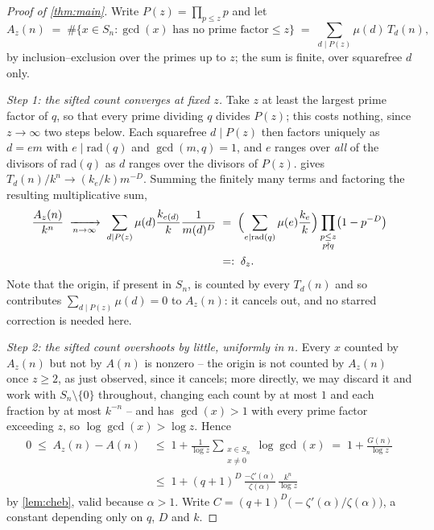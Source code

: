 \documentclass[11pt]{amsart}
\theoremstyle{definition}
\theoremstyle{remark}
\begin{document}
\begin{proof}[Proof of \cref{thm:main}]
Write $P(z) = \prod_{p \le z} p$ and let
\[
  A_z(n) \;=\; \#\{x \in S_n : \gcd(x) \text{ has no prime factor} \le z\}
  \;=\; \sum_{d \mid P(z)} \mu(d)\,T_d(n),
\]
by inclusion--exclusion over the primes up to $z$; the sum is finite, over squarefree $d$ only.

\emph{Step 1: the sifted count converges at fixed $z$.} Take $z$ at least the largest prime factor of $q$, so that every prime dividing $q$ divides $P(z)$; this costs nothing, since $z \to \infty$ two steps below. Each squarefree $d \mid P(z)$ then factors uniquely as $d = e m$ with $e \mid \mathrm{rad}(q)$ and $\gcd(m,q)=1$, and $e$ ranges over \emph{all} of the divisors of $\mathrm{rad}(q)$ as $d$ ranges over the divisors of $P(z)$.  gives $T_d(n)/k^n \to (k_e/k)m^{-D}$. Summing the finitely many terms and factoring the resulting multiplicative sum,
\begin{align*}
  \frac{A_z(n)}{k^{n}} \;\xrightarrow[n\to\infty]{}\;
  \sum_{d \mid P(z)}\mu(d)\frac{k_{e(d)}}{k}\frac{1}{m(d)^{D}}
  &\;=\; \Bigl(\sum_{e \mid \mathrm{rad}(q)}\mu(e)\frac{k_e}{k}\Bigr)
  \prod_{\substack{p \le z \\ p \nmid q}}\bigl(1-p^{-D}\bigr) \\
  &\;=:\; \delta_z .
\end{align*}
Note that the origin, if present in $S_n$, is counted by every $T_d(n)$ and so contributes $\sum_{d\mid P(z)}\mu(d) = 0$ to $A_z(n)$: it cancels out, and no starred correction is needed here.

\emph{Step 2: the sifted count overshoots by little, uniformly in $n$.} Every $x$ counted by $A_z(n)$ but not by $A(n)$ is nonzero -- the origin is not counted by $A_z(n)$ once $z \ge 2$, as just observed, since it cancels; more directly, we may discard it and work with $S_n\setminus\{0\}$ throughout, changing each count by at most $1$ and each fraction by at most $k^{-n}$ -- and has $\gcd(x)>1$ with every prime factor exceeding $z$, so $\log\gcd(x) > \log z$. Hence
\begin{align*}
  0 \;\le\; A_z(n) - A(n)
  &\;\le\; 1 + \frac{1}{\log z}\sum_{\substack{x \in S_n\\ x \ne 0}} \log\gcd(x)
  \;=\; 1 + \frac{G(n)}{\log z} \\
  &\;\le\; 1 + (q+1)^{D}\,\frac{-\zeta'(\alpha)}{\zeta(\alpha)}\,\frac{k^{n}}{\log z}
\end{align*}
by \cref{lem:cheb}, valid because $\alpha>1$. Write $C = (q+1)^{D}\bigl(-\zeta'(\alpha)/\zeta(\alpha)\bigr)$, a constant depending only on $q$, $D$ and $k$.


\end{proof}
\end{document}
